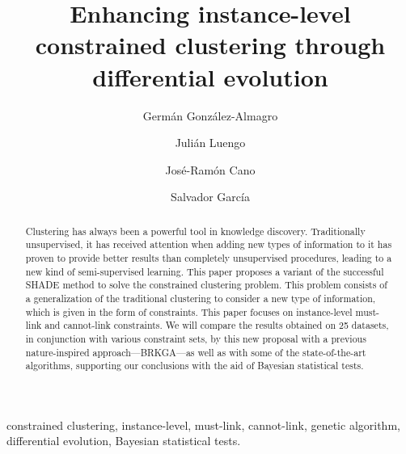 \documentclass[review]{elsarticle}
\begin{document}
\begin{frontmatter}

\title{Enhancing instance-level constrained clustering through differential evolution}

\author[mymainaddress]{Germ\'an Gonz\'alez-Almagro}

\author[mymainaddress]{Juli\'an Luengo}

\author[mysecondaddress]{Jos\'e-Ram\'on Cano}

\author[mymainaddress]{Salvador Garc\'ia}

\address[mymainaddress]{DaSCI Andalusian Institute of Data Science and Computational Intelligence, University of Granada, Spain}

\address[mysecondaddress]{Dept. of Computer Science, EPS of Linares, University of Ja\'en, Campus Cient\'ifico Tecnol\'ogico de Linares, Cintur\'on Sur S/N, Linares 23700, Ja\'en, Spain}

\begin{abstract}
Clustering has always been a powerful tool in knowledge discovery. Traditionally unsupervised, it has received attention when adding new types of information to it has proven to provide better results than completely unsupervised procedures, leading to a new kind of semi-supervised learning. This paper proposes a variant of the successful SHADE method to solve the constrained clustering problem. This problem consists of a generalization of the traditional clustering to consider a new type of information, which is given in the form of constraints. This paper focuses on instance-level must-link and cannot-link constraints. We will compare the results obtained on 25 datasets, in conjunction with various constraint sets, by this new proposal with a previous nature-inspired approach---BRKGA---as well as with some of the state-of-the-art algorithms, supporting our conclusions with the aid of Bayesian statistical tests.
\end{abstract}

\begin{keyword}
constrained clustering, instance-level, must-link, cannot-link, genetic algorithm, differential evolution, Bayesian statistical tests.
\end{keyword}

\end{frontmatter}

\linenumbers
\end{document}
